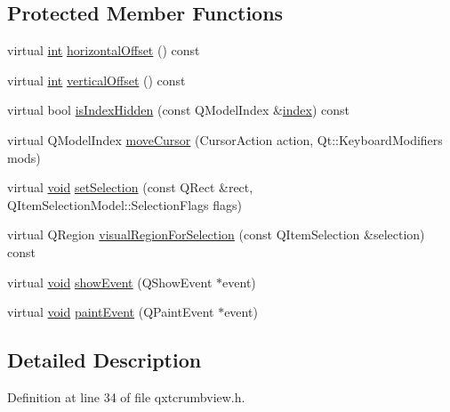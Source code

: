 \subsection*{Protected Member Functions}
\begin{DoxyCompactItemize}
\item 
virtual \hyperlink{ioapi_8h_a787fa3cf048117ba7123753c1e74fcd6}{int} \hyperlink{class_qxt_crumb_view_a140122b7e1f09ed90d8893b5aff66db2}{horizontal\-Offset} () const 
\item 
virtual \hyperlink{ioapi_8h_a787fa3cf048117ba7123753c1e74fcd6}{int} \hyperlink{class_qxt_crumb_view_ae3c4f11bf7611e88d85b8115558e5dd3}{vertical\-Offset} () const 
\item 
virtual bool \hyperlink{class_qxt_crumb_view_a634c94b3b39561579a9cd2e04bc39f15}{is\-Index\-Hidden} (const Q\-Model\-Index \&\hyperlink{glext_8h_ab47dd9958bcadea08866b42bf358e95e}{index}) const 
\item 
virtual Q\-Model\-Index \hyperlink{class_qxt_crumb_view_ae37b3235a3864d16b100589fb199660c}{move\-Cursor} (Cursor\-Action action, Qt\-::\-Keyboard\-Modifiers mods)
\item 
virtual \hyperlink{group___u_a_v_objects_plugin_ga444cf2ff3f0ecbe028adce838d373f5c}{void} \hyperlink{class_qxt_crumb_view_a55205b8257cf659f65737eeafaf7a525}{set\-Selection} (const Q\-Rect \&rect, Q\-Item\-Selection\-Model\-::\-Selection\-Flags flags)
\item 
virtual Q\-Region \hyperlink{class_qxt_crumb_view_a35a4f911b4dc2c4160d2269caf398f10}{visual\-Region\-For\-Selection} (const Q\-Item\-Selection \&selection) const 
\item 
virtual \hyperlink{group___u_a_v_objects_plugin_ga444cf2ff3f0ecbe028adce838d373f5c}{void} \hyperlink{class_qxt_crumb_view_af02434e0ecb060d1f102079b99126713}{show\-Event} (Q\-Show\-Event $\ast$event)
\item 
virtual \hyperlink{group___u_a_v_objects_plugin_ga444cf2ff3f0ecbe028adce838d373f5c}{void} \hyperlink{class_qxt_crumb_view_aee60fb96f5ce09cf4fed8b170b651535}{paint\-Event} (Q\-Paint\-Event $\ast$event)
\end{DoxyCompactItemize}


\subsection{Detailed Description}


Definition at line 34 of file qxtcrumbview.\-h.




